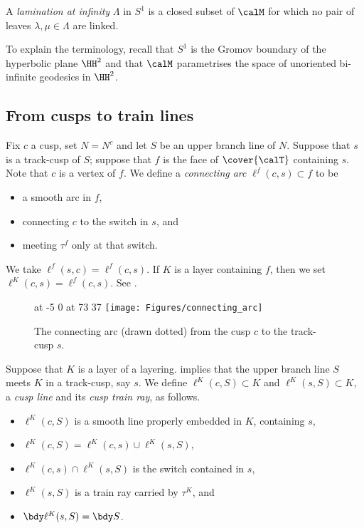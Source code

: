 \documentclass[12pt]{amsart}
\begin{document}
\begin{definition}
\label{Def:LaminationInS1}
A \emph{lamination at infinity} $\Lambda$ in $S^1$ is a closed subset of $\calM$ for which no pair of leaves $\lambda, \mu \in \Lambda$ are linked.
\end{definition}

\noindent 
To explain the terminology, recall that $S^1$ is the Gromov boundary of the hyperbolic plane $\HH^2$ and that $\calM$ parametrises the space of unoriented bi-infinite geodesics in $\HH^2$. 


\subsection{From cusps to train lines}

Fix $c$ a cusp, set $N = N^c$ and let $S$ be an upper branch line of $N$.  Suppose that $s$ is a track-cusp of $S$; suppose that $f$ is the face of $\cover{\calT}$ containing $s$.  Note that $c$ is a vertex of $f$.  We define a \emph{connecting arc} $\ell^f(c, s) \subset f$ to be 
\begin{itemize}
\item 
a smooth arc in $f$, 
\item 
connecting $c$ to the switch in $s$, and 
\item 
meeting $\tau^f$ only at that switch.  
\end{itemize}
We take $\ell^f(s,c) = \ell^f(c,s)$.  If $K$ is a layer containing $f$, then we set $\ell^K(c,s) = \ell^f(c,s)$.  See .

\begin{figure}[htbp]
\small\hair 2pt
 at -5 0 
 at 73 37
\endlabellist
\texttt{[image: Figures/connecting\_arc]}
\caption{The connecting arc (drawn dotted) from the cusp $c$ to the track-cusp $s$.}
\label{Fig:ConnectingArc}
\end{figure}

\begin{definition}
\label{Def:ConnectingLine}
Suppose that $K$ is a layer of a layering.  
 implies that the upper branch line $S$ meets $K$ in a track-cusp, say $s$.  We define $\ell^K(c, S) \subset K$ and $\ell^K(s, S) \subset K$, a \emph{cusp line} and its \emph{cusp train ray}, as follows.
\begin{itemize}
\item $\ell^K(c, S)$ is a smooth line properly embedded in $K$, containing $s$,
\item $\ell^K(c, S) = \ell^K(c, s) \cup \ell^K(s, S)$,
\item $\ell^K(c, s) \cap \ell^K(s, S)$ is the switch contained in $s$,
\item $\ell^K(s, S)$ is a train ray carried by $\tau^K$, and
\item $\bdy\ell^K(s, S) = \bdy S$.  \qedhere
\end{itemize}
\end{definition}
\end{document}

